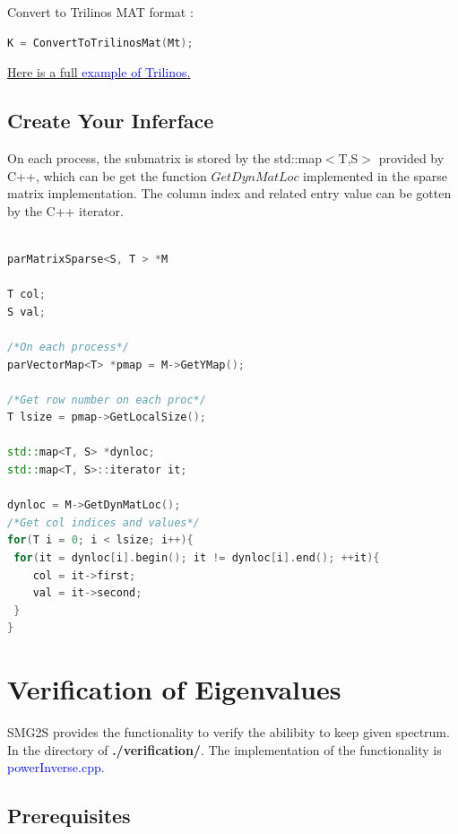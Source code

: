 \documentclass[a4paper, 10 pt]{report}
\begin{document}
	Convert to Trilinos MAT format :
	\begin{lstlisting}[language=C++,frame=single]
   K = ConvertToTrilinosMat(Mt); 
	\end{lstlisting}

	\href{https://github.com/SMG2S/SMG2S/tree/master/example/teptra}{Here is a full \textcolor{blue}{ example of Trilinos}.}
	
	\section{Create Your Inferface}
	
	On each process, the submatrix is stored by the std::map$<$T,S$>$ provided by C++, which can be get the function $GetDynMatLoc$ implemented in the sparse matrix implementation. The column index and related entry value can be gotten by the C++ iterator.
	
	\begin{lstlisting}[language=C++,frame=single]
	
parMatrixSparse<S, T > *M
	
T col;
S val;
	
/*On each process*/
parVectorMap<T> *pmap = M->GetYMap();
   
/*Get row number on each proc*/
T lsize = pmap->GetLocalSize(); 
   
std::map<T, S> *dynloc;
std::map<T, S>::iterator it;
   
dynloc = M->GetDynMatLoc();
/*Get col indices and values*/
for(T i = 0; i < lsize; i++){
 for(it = dynloc[i].begin(); it != dynloc[i].end(); ++it){
   	col = it->first;
   	val = it->second;
 }
}
	\end{lstlisting}
	\newpage

	\chapter{Verification of Eigenvalues}
	
	SMG2S provides the functionality to verify the abilibity to keep given spectrum. In the directory of \textbf{./verification/}. The implementation of the functionality is \textcolor{blue}{powerInverse.cpp}.
	
	\section{Prerequisites}
	
\end{document}
